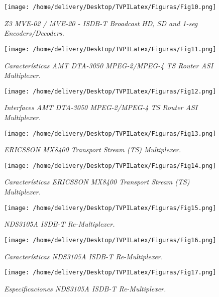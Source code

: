 \documentclass[a4paper,11pt]{article} %
\begin{document}
\begin{figure}[h!] 
\centering
\texttt{[image: /home/delivery/Desktop/TVPILatex/Figuras/Fig10.png]}
\caption{\emph{Z3 MVE-02 / MVE-20 - ISDB-T Broadcast HD, SD and 1-seg
Encoders/Decoders.}}
\end{figure}

\newpage
\begin{figure}[h!] 
\centering
\texttt{[image: /home/delivery/Desktop/TVPILatex/Figuras/Fig11.png]}
\caption{\emph{Caracter\'isticas AMT DTA-3050 MPEG-2/MPEG-4 TS Router
ASI Multiplexer.}}
\end{figure}

\begin{figure}[h!] 
\centering
\texttt{[image: /home/delivery/Desktop/TVPILatex/Figuras/Fig12.png]}
\caption{\emph{Interfaces AMT DTA-3050 MPEG-2/MPEG-4 TS Router ASI
Multiplexer.}}
\end{figure}

\begin{figure}[h!] 
\centering
\texttt{[image: /home/delivery/Desktop/TVPILatex/Figuras/Fig13.png]}
\caption{\emph{ERICSSON MX8400 Transport Stream (TS) Multiplexer.}}
\end{figure}

\begin{figure}[h!] 
\centering
\texttt{[image: /home/delivery/Desktop/TVPILatex/Figuras/Fig14.png]}
\caption{\emph{Caracter\'isticas ERICSSON MX8400 Transport Stream (TS)
Multiplexer.}}
\end{figure}

\begin{figure}[h!] 
\centering
\texttt{[image: /home/delivery/Desktop/TVPILatex/Figuras/Fig15.png]}
\caption{\emph{NDS3105A ISDB-T Re-Multiplexer.}}
\end{figure}

\begin{figure}[h!] 
\centering
\texttt{[image: /home/delivery/Desktop/TVPILatex/Figuras/Fig16.png]}
\caption{\emph{Caracter\'isticas NDS3105A ISDB-T Re-Multiplexer.}}
\end{figure}

\begin{figure}[h!] 
\centering
\texttt{[image: /home/delivery/Desktop/TVPILatex/Figuras/Fig17.png]}
\caption{\emph{Especificaciones NDS3105A ISDB-T Re-Multiplexer.}}
\end{figure}
\end{document}
